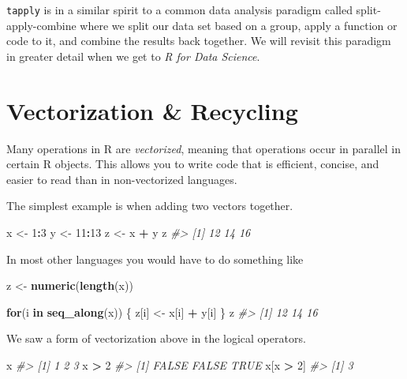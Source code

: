 \documentclass[]{book}
\newenvironment{Shaded}{\begin{snugshade}}{\end{snugshade}}
\newcommand{\KeywordTok}[1]{\textcolor[rgb]{0.13,0.29,0.53}{\textbf{#1}}}
\newcommand{\DecValTok}[1]{\textcolor[rgb]{0.00,0.00,0.81}{#1}}
\newcommand{\StringTok}[1]{\textcolor[rgb]{0.31,0.60,0.02}{#1}}
\newcommand{\CommentTok}[1]{\textcolor[rgb]{0.56,0.35,0.01}{\textit{#1}}}
\newcommand{\ControlFlowTok}[1]{\textcolor[rgb]{0.13,0.29,0.53}{\textbf{#1}}}
\newcommand{\OperatorTok}[1]{\textcolor[rgb]{0.81,0.36,0.00}{\textbf{#1}}}
\newcommand{\NormalTok}[1]{#1}
\theoremstyle{definition}
\theoremstyle{definition}
\theoremstyle{definition}
\theoremstyle{remark}
\begin{document}
\texttt{tapply} is in a similar spirit to a common data analysis
paradigm called split-apply-combine where we split our data set based on
a group, apply a function or code to it, and combine the results back
together. We will revisit this paradigm in greater detail when we get to
\emph{R for Data Science}.

\section{Vectorization \& Recycling}\label{vectorization-recycling}

Many operations in R are \emph{vectorized}, meaning that operations
occur in parallel in certain R objects. This allows you to write code
that is efficient, concise, and easier to read than in non-vectorized
languages.

The simplest example is when adding two vectors together.

\begin{Shaded}
\begin{Highlighting}[]
\NormalTok{x <-}\StringTok{ }\DecValTok{1}\OperatorTok{:}\DecValTok{3}
\NormalTok{y <-}\StringTok{ }\DecValTok{11}\OperatorTok{:}\DecValTok{13}
\NormalTok{z <-}\StringTok{ }\NormalTok{x }\OperatorTok{+}\StringTok{ }\NormalTok{y}
\NormalTok{z}
\CommentTok{#> [1] 12 14 16}
\end{Highlighting}
\end{Shaded}

In most other languages you would have to do something like

\begin{Shaded}
\begin{Highlighting}[]
\NormalTok{z <-}\StringTok{ }\KeywordTok{numeric}\NormalTok{(}\KeywordTok{length}\NormalTok{(x))}

\ControlFlowTok{for}\NormalTok{(i }\ControlFlowTok{in} \KeywordTok{seq_along}\NormalTok{(x)) \{}
\NormalTok{      z[i] <-}\StringTok{ }\NormalTok{x[i] }\OperatorTok{+}\StringTok{ }\NormalTok{y[i]}
\NormalTok{\}}
\NormalTok{z}
\CommentTok{#> [1] 12 14 16}
\end{Highlighting}
\end{Shaded}

We saw a form of vectorization above in the logical operators.

\begin{Shaded}
\begin{Highlighting}[]
\NormalTok{x}
\CommentTok{#> [1] 1 2 3}
\NormalTok{x }\OperatorTok{>}\StringTok{ }\DecValTok{2}
\CommentTok{#> [1] FALSE FALSE  TRUE}
\NormalTok{x[x }\OperatorTok{>}\StringTok{ }\DecValTok{2}\NormalTok{]}
\CommentTok{#> [1] 3}
\end{Highlighting}
\end{Shaded}
\end{document}
